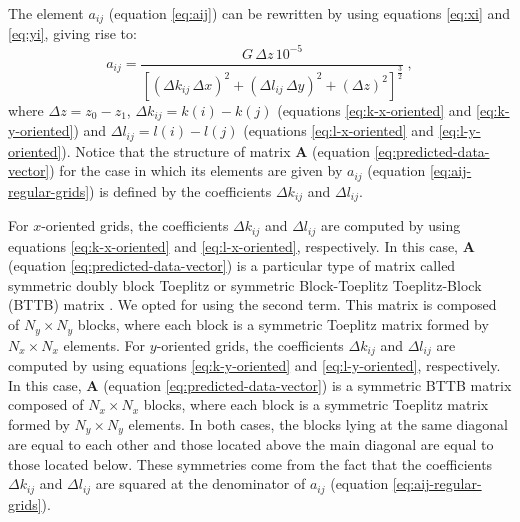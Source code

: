 \documentclass[manuscript,revised]{geophysics}
\begin{document}
The element $a_{ij}$ (equation \ref{eq:aij}) can be rewritten 
by using equations \ref{eq:xi} and \ref{eq:yi}, giving rise to:
\begin{equation}
a_{ij} = \frac{G \, \Delta z \, 10^{-5}}{ \left[ 
	\left( \Delta k_{ij} \, \Delta x \right)^{2} + 
	\left( \Delta l_{ij} \, \Delta y \right)^{2} + 
	\left( \Delta z \right)^{2} \right]^{\frac{3}{2}}} \: ,
\label{eq:aij-regular-grids}
\end{equation}
where $\Delta z = z_{0} - z_{1}$, 
$\Delta k_{ij} = k(i) - k(j)$ (equations \ref{eq:k-x-oriented} and \ref{eq:k-y-oriented}) and
$\Delta l_{ij} = l(i) - l(j)$ (equations \ref{eq:l-x-oriented} and \ref{eq:l-y-oriented}).
Notice that the structure of matrix $\mathbf{A}$ (equation \ref{eq:predicted-data-vector}) for 
the case in which its elements are given by $a_{ij}$ (equation \ref{eq:aij-regular-grids}) is 
defined by the coefficients $\Delta k_{ij}$ and $\Delta l_{ij}$.

For $x$-oriented grids, the coefficients $\Delta k_{ij}$ and $\Delta l_{ij}$ are 
computed by using equations \ref{eq:k-x-oriented} and \ref{eq:l-x-oriented}, respectively.
In this case, $\mathbf{A}$ (equation \ref{eq:predicted-data-vector}) is a 
particular type of matrix called symmetric doubly block Toeplitz \citep[][ p. 28]{jain1989}
or symmetric Block-Toeplitz Toeplitz-Block (BTTB) matrix \citep[][ p. 67]{chan-jin2007}.
We opted for using the second term. This matrix is 
composed of $N_{y} \times N_{y}$ blocks, where each block is a symmetric Toeplitz matrix
formed by $N_{x} \times N_{x}$ elements.
For $y$-oriented grids, the coefficients $\Delta k_{ij}$ and $\Delta l_{ij}$ are 
computed by using equations \ref{eq:k-y-oriented} and \ref{eq:l-y-oriented}, respectively.
In this case, $\mathbf{A}$ (equation \ref{eq:predicted-data-vector}) is a 
symmetric BTTB matrix composed of $N_{x} \times N_{x}$ blocks, where each block is a
symmetric Toeplitz matrix formed by $N_{y} \times N_{y}$ elements.
In both cases, the blocks lying at the same diagonal are equal to each other
and those located above the main diagonal are equal to those located below.
These symmetries come from the fact that the coefficients
$\Delta k_{ij}$ and $\Delta l_{ij}$ are squared at the denominator of 
$a_{ij}$ (equation \ref{eq:aij-regular-grids}).
\end{document}
